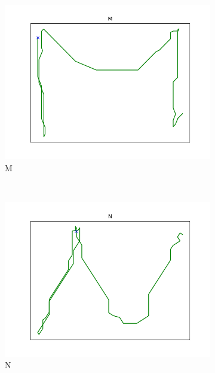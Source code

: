 \begin{figure}
\begin{subfigure}[b]{0.14\textwidth}
        \includegraphics[width=\textwidth]{images/gbem/orig_letters_fig/AORIG_letter_M_writer_10.png}
        \caption{M}
    \end{subfigure}
    ~
    \begin{subfigure}[b]{0.14\textwidth}
        \includegraphics[width=\textwidth]{images/gbem/orig_letters_fig/AORIG_letter_N_writer_1.png}
        \caption{N}
    \end{subfigure}
    ~
    \begin{subfigure}[b]{0.14\textwidth}

\end{subfigure}
\end{figure}
